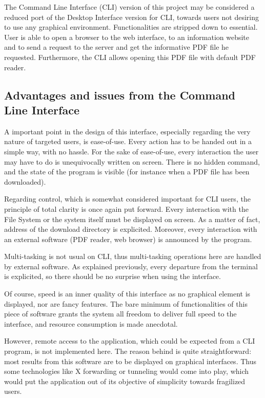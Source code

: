 \documentclass[a4paper,12pt, twocolumn]{article}
\begin{document}
The Command Line Interface (CLI) version of this project may be considered a reduced port of the Desktop Interface version for CLI, towards users not desiring to use any graphical environment. Functionalities are stripped down to essential. User is able to open a browser to the web interface, to an information website and to send a request to the server and get the informative PDF file he requested. Furthermore, the CLI allows opening this PDF file with default PDF reader.

\subsection*{Advantages and issues from the Command Line Interface}

A important point in the design of this interface, especially regarding the very nature of targeted users, is ease-of-use. Every action has to be handed out in a simple way, with no hassle. For the sake of ease-of-use, every interaction the user may have to do is unequivocally written on screen. There is no hidden command, and the state of the program is visible (for instance when a PDF file has been downloaded).

Regarding control, which is somewhat considered important for CLI users, the principle of total clarity is once again put forward. Every interaction with the File System or the system itself must be displayed on screen. As a matter of fact, address of the download directory is explicited. Moreover, every interaction with an external software (PDF reader, web browser) is announced by the program.

Multi-tasking is not usual on CLI, thus multi-tasking operations here are handled by external software. As explained previously, every departure from the terminal is explicited, so there should be no surprise when using the interface.

Of course, speed is an inner quality of this interface as no graphical element is displayed, nor are fancy features. The bare minimum of functionalities of this piece of software grants the system all freedom to deliver full speed to the interface, and resource consumption is made anecdotal.

However, remote access to the application, which could be expected from a CLI program, is not implemented here. The reason behind is quite straightforward: most results from this software are to be displayed on graphical interfaces. Thus some technologies like X forwarding or tunneling would come into play, which would put the application out of its objective of simplicity towards fragilized users.
\end{document}
